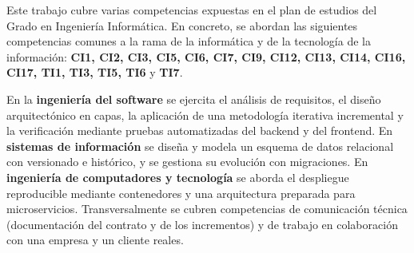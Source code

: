 Este trabajo cubre varias competencias expuestas en el plan de estudios del Grado en Ingeniería 
Informática. En concreto, se abordan las siguientes competencias comunes a la rama de la informática y de la 
tecnología de la información: \textbf{CI1, CI2, CI3, CI5, CI6, CI7, CI9, CI12, CI13, CI14, CI16, CI17, TI1, TI3, TI5, TI6} y \textbf{TI7}.

En la \textbf{ingeniería del software} se ejercita el análisis de requisitos, el diseño arquitectónico en capas, 
la aplicación de una metodología iterativa incremental y la verificación mediante pruebas automatizadas del backend 
y del frontend. En \textbf{sistemas de información} se diseña y modela un esquema de datos relacional con 
versionado e histórico, y se gestiona su evolución con migraciones. En \textbf{ingeniería de computadores y tecnología}
 se aborda el despliegue reproducible mediante contenedores y una arquitectura preparada para microservicios.
Transversalmente se cubren competencias de comunicación técnica (documentación del contrato y de los incrementos) 
y de trabajo en colaboración con una empresa y un cliente reales.
